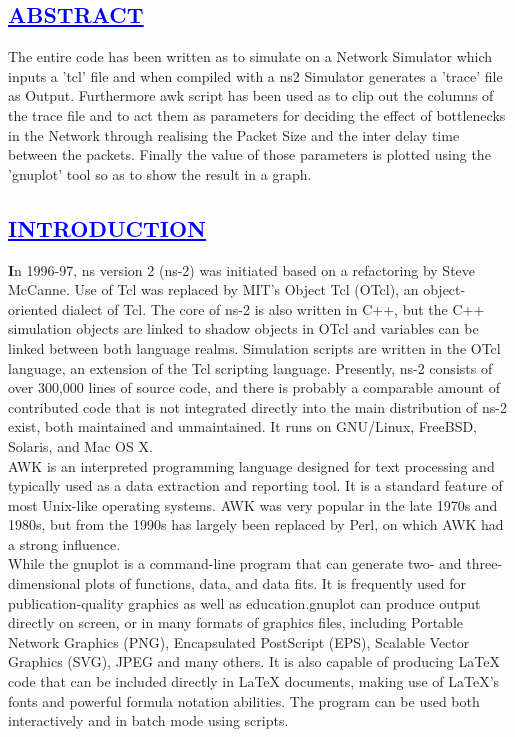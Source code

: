 \documentclass[a4paper,12pt]{report}
\begin{document}
\begin{center}
\chapter{\textcolor{blue}{\underline {ABSTRACT}}}
\end{center}
\noindent The entire code has been written as to simulate on a Network Simulator which inputs a 'tcl' file and when compiled with a ns2 Simulator generates a 'trace' file as Output.
	  Furthermore awk script has been used as to clip out the columns of the trace file and to act them as parameters for deciding the effect of bottlenecks in the Network through
	  realising the Packet Size and the inter delay time between the packets. Finally the value of those parameters is plotted using the 'gnuplot' tool so as to show the result in a graph.
\begin{center}
\chapter{\textcolor{blue}{\underline {INTRODUCTION}}}
\end{center}
\noindent \textbf In 1996-97, ns version 2 (ns-2) was initiated based on a refactoring by Steve McCanne. Use of Tcl was replaced by MIT's Object Tcl (OTcl), an object-oriented dialect of Tcl.
		  The core of ns-2 is also written in C++, but the C++ simulation objects are linked to shadow objects in OTcl and variables can be linked between both language realms.
		  Simulation scripts are written in the OTcl language, an extension of the Tcl scripting language.
                  Presently, ns-2 consists of over 300,000 lines of source code, and there is probably a comparable amount of contributed code that is not integrated directly into the main distribution of ns-2 exist,
                  both maintained and unmaintained. It runs on GNU/Linux, FreeBSD, Solaris, and Mac OS X.\\
		  
		  AWK is an interpreted programming language designed for text processing and typically used as a data extraction and reporting tool. 
		  It is a standard feature of most Unix-like operating systems. AWK was very popular in the late 1970s and 1980s, but from the 1990s has largely been replaced by Perl,
		  on which AWK had a strong influence.\\
		  
		 While the gnuplot is a command-line program that can generate two- and three-dimensional plots of functions, data, and data fits. 
		    It is frequently used for publication-quality graphics as well as education.gnuplot can produce output directly on screen, 
		    or in many formats of graphics files, including Portable Network Graphics (PNG), Encapsulated PostScript (EPS), Scalable Vector Graphics (SVG), JPEG and many others. 
		    It is also capable of producing LaTeX code that can be included directly in LaTeX documents, making use of LaTeX's fonts and powerful formula notation abilities.
		    The program can be used both interactively and in batch mode using scripts.
\end{document}
